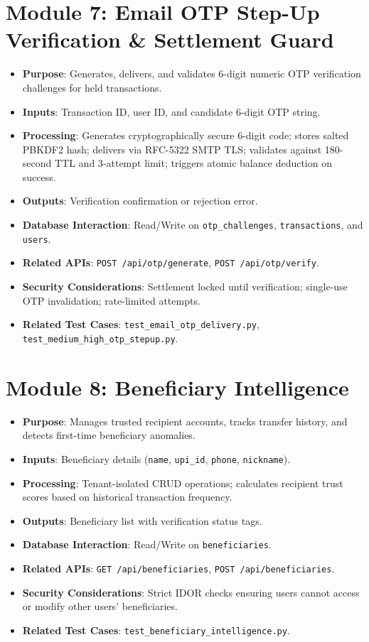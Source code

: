 \section{Module 7: Email OTP Step-Up Verification \& Settlement Guard}
\begin{itemize}
    \item \textbf{Purpose}: Generates, delivers, and validates 6-digit numeric OTP verification challenges for held transactions.
    \item \textbf{Inputs}: Transaction ID, user ID, and candidate 6-digit OTP string.
    \item \textbf{Processing}: Generates cryptographically secure 6-digit code; stores salted PBKDF2 hash; delivers via RFC-5322 SMTP TLS; validates against 180-second TTL and 3-attempt limit; triggers atomic balance deduction on success.
    \item \textbf{Outputs}: Verification confirmation or rejection error.
    \item \textbf{Database Interaction}: Read/Write on \texttt{otp\_challenges}, \texttt{transactions}, and \texttt{users}.
    \item \textbf{Related APIs}: \texttt{POST /api/otp/generate}, \texttt{POST /api/otp/verify}.
    \item \textbf{Security Considerations}: Settlement locked until verification; single-use OTP invalidation; rate-limited attempts.
    \item \textbf{Related Test Cases}: \texttt{test\_email\_otp\_delivery.py}, \texttt{test\_medium\_high\_otp\_stepup.py}.
\end{itemize}

\section{Module 8: Beneficiary Intelligence}
\begin{itemize}
    \item \textbf{Purpose}: Manages trusted recipient accounts, tracks transfer history, and detects first-time beneficiary anomalies.
    \item \textbf{Inputs}: Beneficiary details (\texttt{name}, \texttt{upi\_id}, \texttt{phone}, \texttt{nickname}).
    \item \textbf{Processing}: Tenant-isolated CRUD operations; calculates recipient trust scores based on historical transaction frequency.
    \item \textbf{Outputs}: Beneficiary list with verification status tags.
    \item \textbf{Database Interaction}: Read/Write on \texttt{beneficiaries}.
    \item \textbf{Related APIs}: \texttt{GET /api/beneficiaries}, \texttt{POST /api/beneficiaries}.
    \item \textbf{Security Considerations}: Strict IDOR checks ensuring users cannot access or modify other users' beneficiaries.
    \item \textbf{Related Test Cases}: \texttt{test\_beneficiary\_intelligence.py}.
\end{itemize}

